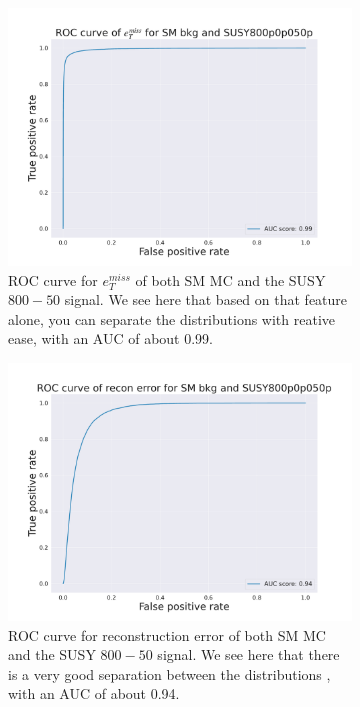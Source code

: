\begin{figure}[h!]
    \centering
    \begin{subfigure}{.45\textwidth}
    \includegraphics[width=\textwidth]{Figures/AE_testing/big/roc_curve_etmiss_800p0p050p.pdf}
        \caption{ROC curve for $e_T^{miss}$ of both SM MC and the SUSY $800-50$ signal. We see here that based on that feature alone, you can separate 
        the distributions with reative ease, with an AUC of about 0.99. }
    \end{subfigure}
    \hfill
    \begin{subfigure}{.45\textwidth}
        \includegraphics[width=\textwidth]{Figures/AE_testing/big/roc_curve_recon_err_800p0p050p.pdf}
            \caption{ROC curve for reconstruction error of both SM MC and the SUSY $800-50$ signal. We see here that there is a very good separation between the distributions
            , with an AUC of about 0.94.}
        \end{subfigure}
        \hfill
    \caption{ }
    \label{fig:roc_susy_800_50}
\end{figure}

